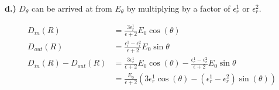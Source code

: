 \documentclass[10pt]{article} %
\begin{document}
\textbf{d.)}
$D_\theta$ can be arrived at from $E_{\theta}$ by multiplying by a factor of $\epsilon_r^1$ or $\epsilon_r^2$. 

\begin{align*}
  D_{in}(R) &= \frac{3\epsilon_r^1}{\epsilon+2}E_0\cos(\theta)\\
  D_{out}(R) &= \frac{\epsilon_r^1-\epsilon_r^2}{\epsilon+2}E_0\sin\theta\\
  D_{in}(R) - D_{out}(R) &= \frac{3\epsilon_r^1}{\epsilon+2}E_0\cos(\theta) - \frac{\epsilon_r^1-\epsilon_r^2}{\epsilon+2}E_0\sin\theta\\
  &= \frac{E_0}{\epsilon+2}\left(3\epsilon_r^1\cos(\theta) - \left(\epsilon_r^1 - \epsilon_r^2\right)\sin(\theta)\right)
\end{align*}
\end{document}
